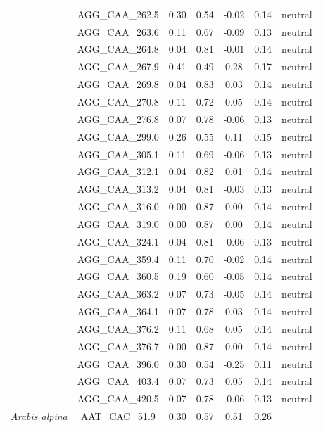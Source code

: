 \documentclass[11pt,]{article}
\begin{document}
\begin{longtable}[c]{@{}lcccccc@{}}
& AGG\_CAA\_262.5 & 0.30 & 0.54 & -0.02 & 0.14 & neutral
\\\addlinespace
& AGG\_CAA\_263.6 & 0.11 & 0.67 & -0.09 & 0.13 & neutral
\\\addlinespace
& AGG\_CAA\_264.8 & 0.04 & 0.81 & -0.01 & 0.14 & neutral
\\\addlinespace
& AGG\_CAA\_267.9 & 0.41 & 0.49 & 0.28 & 0.17 & neutral
\\\addlinespace
& AGG\_CAA\_269.8 & 0.04 & 0.83 & 0.03 & 0.14 & neutral
\\\addlinespace
& AGG\_CAA\_270.8 & 0.11 & 0.72 & 0.05 & 0.14 & neutral
\\\addlinespace
& AGG\_CAA\_276.8 & 0.07 & 0.78 & -0.06 & 0.13 & neutral
\\\addlinespace
& AGG\_CAA\_299.0 & 0.26 & 0.55 & 0.11 & 0.15 & neutral
\\\addlinespace
& AGG\_CAA\_305.1 & 0.11 & 0.69 & -0.06 & 0.13 & neutral
\\\addlinespace
& AGG\_CAA\_312.1 & 0.04 & 0.82 & 0.01 & 0.14 & neutral
\\\addlinespace
& AGG\_CAA\_313.2 & 0.04 & 0.81 & -0.03 & 0.13 & neutral
\\\addlinespace
& AGG\_CAA\_316.0 & 0.00 & 0.87 & 0.00 & 0.14 & neutral
\\\addlinespace
& AGG\_CAA\_319.0 & 0.00 & 0.87 & 0.00 & 0.14 & neutral
\\\addlinespace
& AGG\_CAA\_324.1 & 0.04 & 0.81 & -0.06 & 0.13 & neutral
\\\addlinespace
& AGG\_CAA\_359.4 & 0.11 & 0.70 & -0.02 & 0.14 & neutral
\\\addlinespace
& AGG\_CAA\_360.5 & 0.19 & 0.60 & -0.05 & 0.14 & neutral
\\\addlinespace
& AGG\_CAA\_363.2 & 0.07 & 0.73 & -0.05 & 0.14 & neutral
\\\addlinespace
& AGG\_CAA\_364.1 & 0.07 & 0.78 & 0.03 & 0.14 & neutral
\\\addlinespace
& AGG\_CAA\_376.2 & 0.11 & 0.68 & 0.05 & 0.14 & neutral
\\\addlinespace
& AGG\_CAA\_376.7 & 0.00 & 0.87 & 0.00 & 0.14 & neutral
\\\addlinespace
& AGG\_CAA\_396.0 & 0.30 & 0.54 & -0.25 & 0.11 & neutral
\\\addlinespace
& AGG\_CAA\_403.4 & 0.07 & 0.73 & 0.05 & 0.14 & neutral
\\\addlinespace
& AGG\_CAA\_420.5 & 0.07 & 0.78 & -0.06 & 0.13 & neutral
\\\addlinespace
\textit{Arabis alpina} & AAT\_CAC\_51.9 & 0.30 & 0.57 & 0.51 & 0.26 &

\end{longtable}
\end{document}
